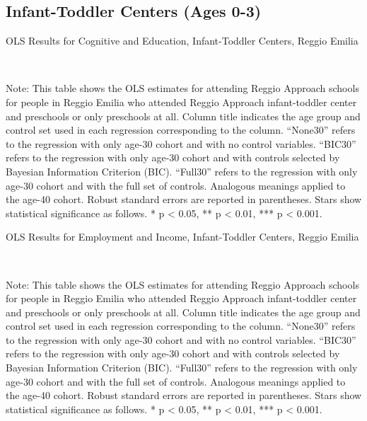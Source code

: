 \subsection{Infant-Toddler Centers (Ages 0-3)}
\begin{table}[H] \caption{OLS Results for Cognitive and Education, Infant-Toddler Centers, Reggio Emilia} \label{ols-E-itc-reg}
\scalebox{0.9}{
}
\vspace{1ex} \\
\footnotesize\raggedright{Note: This table shows the OLS estimates for attending Reggio Approach schools for people in Reggio Emilia who attended Reggio Approach infant-toddler center and preschools or only preschools at all. Column title indicates the age group and control set used in each regression corresponding to the column. ``None30'' refers to the regression with only age-30 cohort and with no control variables. ``BIC30'' refers to the regression with only age-30 cohort and with controls selected by Bayesian Information Criterion (BIC). ``Full30'' refers to the regression with only age-30 cohort and with the full set of controls. Analogous meanings applied to the age-40 cohort. Robust standard errors are reported in parentheses. Stars show statistical significance as follows. * p < 0.05, ** p < 0.01, *** p < 0.001.}
\end{table}

\begin{table}[H] \caption{OLS Results for Employment and Income, Infant-Toddler Centers, Reggio Emilia} \label{ols-W-itc-reg}
\scalebox{0.9}{
}
\vspace{1ex} \\
\footnotesize\raggedright{Note: This table shows the OLS estimates for attending Reggio Approach schools for people in Reggio Emilia who attended Reggio Approach infant-toddler center and preschools or only preschools at all. Column title indicates the age group and control set used in each regression corresponding to the column. ``None30'' refers to the regression with only age-30 cohort and with no control variables. ``BIC30'' refers to the regression with only age-30 cohort and with controls selected by Bayesian Information Criterion (BIC). ``Full30'' refers to the regression with only age-30 cohort and with the full set of controls. Analogous meanings applied to the age-40 cohort. Robust standard errors are reported in parentheses. Stars show statistical significance as follows. * p < 0.05, ** p < 0.01, *** p < 0.001.}
\end{table}


